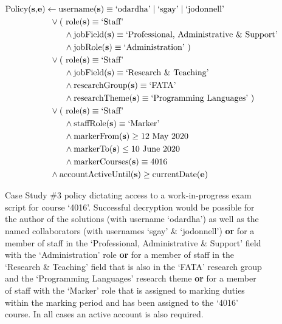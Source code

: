 \begin{figure}[ht]
  \centering
\begin{align*}
  \text{Policy(\textbf{s},\textbf{e})}
  &
    \leftarrow
    \text{username(\textbf{s})} \equiv \text{`odardha'} \mid \text{`sgay'} \mid \text{`jodonnell'}
  \\
  &
    \phantom{::}\vee
    \text{( role(\textbf{s})} \equiv \text{`Staff'}
  \\
  &
    \phantom{::::::::}\wedge
    \text{jobField(\textbf{s})} \equiv \text{`Professional, Administrative \& Support'}
  \\
  &
    \phantom{::::::::}\wedge
    \text{jobRole(\textbf{s})} \equiv \text{`Administration' )}
  \\
  &
    \phantom{::}\vee
    \text{( role(\textbf{s})} \equiv \text{`Staff'}
  \\
  &
    \phantom{::::::::}\wedge
    \text{jobField(\textbf{s})} \equiv \text{`Research \& Teaching'}
  \\
  &
    \phantom{::::::::}\wedge
    \text{researchGroup(\textbf{s})} \equiv \text{`FATA'}
  \\
  &
    \phantom{::::::::}\wedge
    \text{researchTheme(\textbf{s})} \equiv \text{`Programming Languages' )}
  \\
  &
    \phantom{::}\vee
    \text{( role(\textbf{s})} \equiv \text{`Staff'}
  \\
  &
    \phantom{::::::::}\wedge
    \text{staffRole(\textbf{s})} \equiv \text{`Marker'}
  \\
  &
    \phantom{::::::::}\wedge
    \text{markerFrom(\textbf{s})} \geq \text{12 May 2020}
  \\
  &
    \phantom{::::::::}\wedge
    \text{markerTo(\textbf{s})} \leq \text{10 June 2020}
  \\
  &
    \phantom{::::::::}\wedge
    \text{markerCourses(\textbf{s})} \equiv \text{4016}
  \\
  &
    \phantom{::}\wedge
    \text{accountActiveUntil(\textbf{s})} \geq \text{currentDate(\textbf{e})}
\end{align*}
  \caption{
    \label{fig:case_study_policy_3}
    Case Study \#3 policy dictating access to a work-in-progress exam script for course `4016'.
    Successful decryption would be possible for the author of the solutions (with username `odardha') as well as the named collaborators (with usernames `sgay' \& `jodonnell') \textbf{or} for a member of staff in the `Professional, Administrative \& Support' field with the `Administration' role \textbf{or} for a member of staff in the `Research \& Teaching' field that is also in the `FATA' research group and the `Programming Languages' research theme \textbf{or} for a member of staff with the `Marker' role that is assigned to marking duties within the marking period and has been assigned to the `4016' course. In all cases an active account is also required.
  }
\end{figure}

